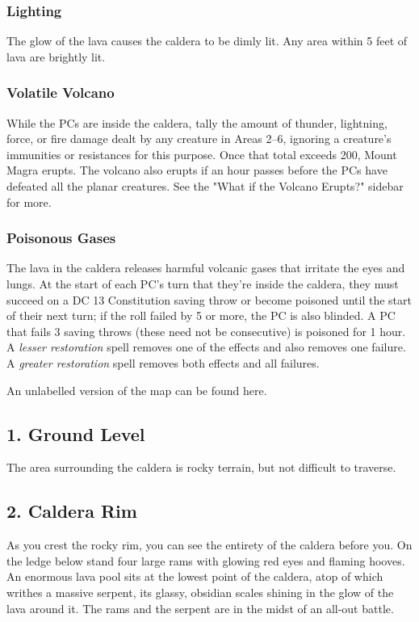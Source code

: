 \documentclass[10pt,a4paper,twoside,bg=print,twocolumn,openany,nodeprecatedcode]{dndbook}
\begin{document}
\subsubsection{Lighting}
The glow of the lava causes the caldera to be dimly lit. Any area within 5 feet of lava are brightly lit.

\subsubsection{Volatile Volcano}
While the PCs are inside the caldera, tally the amount of thunder, lightning, force, or fire damage dealt by any creature in Areas 2–6, ignoring a creature's immunities or resistances for this purpose. Once that total exceeds 200, Mount Magra erupts. The volcano also erupts if an hour passes before the PCs have defeated all the planar creatures. See the "What if the Volcano Erupts?" sidebar for more.

\subsubsection{Poisonous Gases}
The lava in the caldera releases harmful volcanic gases that irritate the eyes and lungs. At the start of each PC's turn that they're inside the caldera, they must succeed on a DC 13 Constitution saving throw or become poisoned until the start of their next turn; if the roll failed by 5 or more, the PC is also blinded. A PC that fails 3 saving throws (these need not be consecutive) is poisoned for 1 hour. A \textit{lesser restoration} spell removes one of the effects and also removes one failure. A \textit{greater restoration} spell removes both effects and all failures.

An unlabelled version of the map can be found here.

\subsection{1. Ground Level}
The area surrounding the caldera is rocky terrain, but not difficult to traverse.

\subsection{2. Caldera Rim}
\begin{DndReadAloud}{}
As you crest the rocky rim, you can see the entirety of the caldera before you. On the ledge below stand four large rams with glowing red eyes and flaming hooves. An enormous lava pool sits at the lowest point of the caldera, atop of which writhes a massive serpent, its glassy, obsidian scales shining in the glow of the lava around it. The rams and the serpent are in the midst of an all-out battle.

\end{DndReadAloud}
\end{document}
